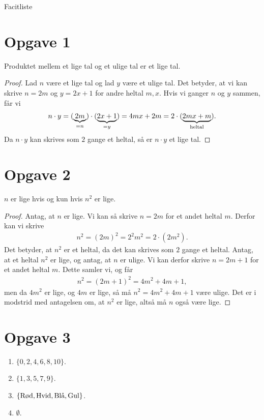 

\begin{center}
\Huge
Facitliste
\end{center}
\section*{Opgave 1}
\begin{setn}
Produktet mellem et lige tal og et ulige tal er et lige tal.
\end{setn}
\begin{proof}
Lad $n$ være et lige tal og lad $y$ være et ulige tal. Det betyder, at vi kan skrive $n = 2m$ og $y = 2x+1$ for andre heltal $m,x$. Hvis vi ganger $n$ og $y$ sammen, får vi
\begin{align*}
n\cdot y = (\underbrace{2m}_{=n})\cdot (\underbrace{2x+1}_{=y}) = 4mx+2m = 2\cdot(\underbrace{2mx+m}_{\textnormal{heltal}}).
\end{align*}
Da $n\cdot y$ kan skrives som $2$ gange et heltal, så er $n\cdot y$ et lige tal.
\end{proof}

\section*{Opgave 2}
\begin{setn}
$n$ er lige hvis og kun hvis $n^2$ er lige.
\end{setn}
\begin{proof}
Antag, at $n$ er lige. Vi kan så skrive $n = 2m$ for et andet heltal $m$. Derfor kan vi skrive
\begin{align*}
n^2 = (2m)^2 = 2^2m^2 = 2\cdot(2m^2).
\end{align*}
Det betyder, at $n^2$ er et heltal, da det kan skrives som $2$ gange et heltal. 
Antag, at et heltal $n^2$ er lige, og antag, at $n$ er ulige. Vi kan derfor skrive $n = 2m + 1$ for et andet heltal $m$. Dette samler vi, og får 
\begin{align*}
n^2 = (2m+1)^2 = 4m^2+4m+1,
\end{align*}
men da $4m^2$ er lige, og $4m$ er lige, så må  $n^2 = 4m^2+4m+1$ være ulige. Det er i modstrid med antagelsen om, at $n^2$ er lige, altså må $n$ også være lige.
\end{proof}

\section*{Opgave 3}
\begin{enumerate}[label=\roman*)]
\item $\{0,2,4,6,8,10\}$.
\item $\{1,3,5,7,9\}$.
\item $\{\textnormal{Rød},\textnormal{Hvid},\textnormal{Blå},\textnormal{Gul}\}$.
\item $\emptyset$.
\end{enumerate}

